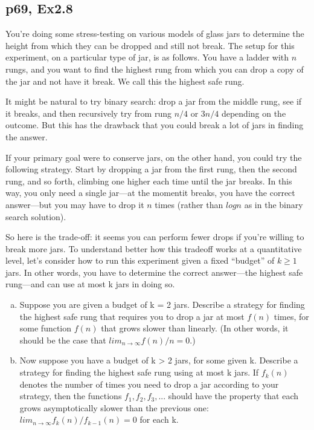 \documentclass[a4paper]{article}
\begin{document}
\subsection*{p69, Ex2.8}
\begin{adjustwidth}{1cm}{1cm}
	You’re doing some stress-testing on various models of glass jars to
	determine the height from which they can be dropped and still not break.
	The setup for this experiment, on a particular type of jar, is as follows.
	You have a ladder with $n$ rungs, and you want to find the highest rung
	from which you can drop a copy of the jar and not have it break. We call
	this the highest safe rung.
	\par It might be natural to try binary search: drop a jar from the middle
	rung, see if it breaks, and then recursively try from rung $n/4$ or $3n/4$
	depending on the outcome. But this has the drawback that you could
	break a lot of jars in finding the answer.
	\par If your primary goal were to conserve jars, on the other hand, you
	could try the following strategy. Start by dropping a jar from the first
	rung, then the second rung, and so forth, climbing one higher each time
	until the jar breaks. In this way, you only need a single jar—at the momentit breaks, you have the correct answer—but you may have to drop it $n$
	times (rather than $log n$ as in the binary search solution).
	\par So here is the trade-off: it seems you can perform fewer drops if
	you’re willing to break more jars. To understand better how this tradeoff
	works at a quantitative level, let’s consider how to run this experiment
	given a fixed “budget” of $k \geq 1$ jars. In other words, you have to determine
	the correct answer—the highest safe rung—and can use at most k jars in
	doing so.
	\begin{enumerate}[(a)]
		\item Suppose you are given a budget of k = 2 jars. Describe a strategy for
		      finding the highest safe rung that requires you to drop a jar at most
		      $f(n)$ times, for some function $f(n)$ that grows slower than linearly. (In
		      other words, it should be the case that $lim_{n→∞} f(n)/n = 0$.)
		\item Now suppose you have a budget of k > 2 jars, for some given k.
		      Describe a strategy for finding the highest safe rung using at most
		      k jars. If $f_k(n)$ denotes the number of times you need to drop a jar
		      according to your strategy, then the functions $f_1, f_2, f_3, . . .$ should have the property that each grows asymptotically slower than the previous
		      one: $lim_{n→∞} f_k(n)/f_{k−1}(n) = 0$ for each k.
	\end{enumerate}
\end{adjustwidth}
\end{document}
